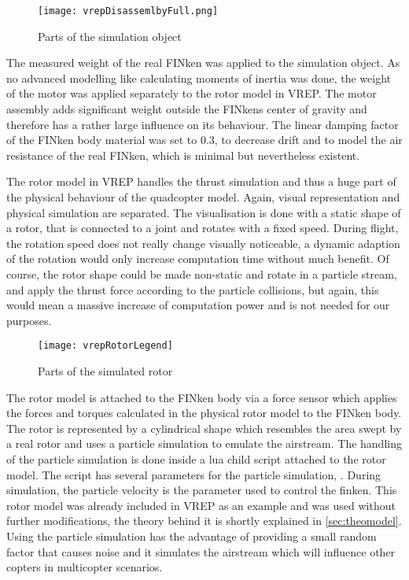 \begin{figure}[h!]
 \begin{center}
  \texttt{[image: vrepDisassemlbyFull.png]}
 \end{center}
  \caption{Parts of the simulation object \label{fig:vrepParts}}
\end{figure}

The measured weight of the real FINken was applied to the simulation object. As no advanced modelling like calculating moments of inertia was done, the weight of the motor was applied separately to the rotor model in VREP.  The motor assembly adds significant weight outside the FINkens center of gravity and therefore has a rather large influence on its behaviour. 
The linear damping factor of the FINken body material was set to 0.3, to decrease drift and to model the air resistance of the real FINken, which is minimal but nevertheless existent.


The rotor model in VREP handles the thrust simulation and thus a huge part of the physical behaviour of the quadcopter model.  Again, visual representation and physical simulation are separated. 
The visualisation is done with a static shape of a rotor, that is connected to a joint and rotates with a fixed speed. During flight, the rotation speed does not really change visually noticeable, a dynamic adaption of the rotation would only increase computation time without much benefit. Of course, the rotor shape could be made non-static and rotate in a particle stream, and apply the thrust force according to the particle collisions, but again, this would mean a massive increase of computation power and is not needed for our purposes.

\begin{figure}[h!]
 \begin{center}
  \texttt{[image: vrepRotorLegend]}
 \end{center}
  \caption{Parts of the simulated rotor \label{fig:vrepRotor}}
\end{figure}


The rotor model is attached to the FINken body via a force sensor which applies the forces and torques calculated in the physical rotor model to the FINken body. The rotor is represented by a cylindrical shape which resembles the area swept by a real rotor and uses a particle simulation to emulate the airstream. The handling of the particle simulation is done inside a lua child script attached to the rotor model. The script has several parameters for the particle simulation, .
During simulation, the particle velocity is the parameter used to control the finken. This rotor model was already included in VREP as an example and was used without further modifications, the theory behind it is shortly explained in \ref{sec:theomodel}. Using the particle simulation has the advantage of providing a small random factor that causes noise and it simulates the airstream which will influence  other copters in multicopter scenarios.

